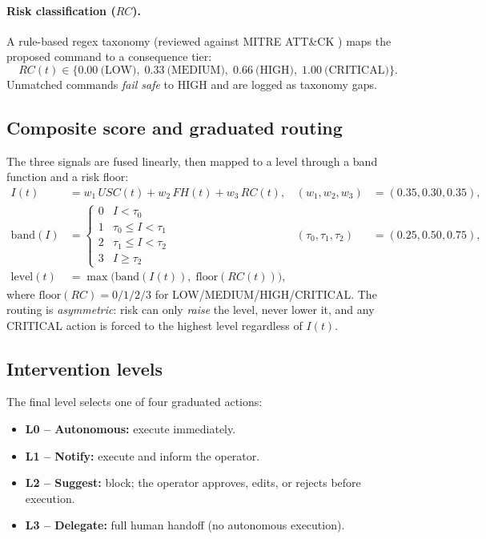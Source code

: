 \documentclass[11pt]{article}
\begin{document}
\paragraph{Risk classification ($RC$).} A rule-based regex taxonomy (reviewed against MITRE
ATT\&CK \citep{strom2018attack}) maps the proposed command to a consequence tier:
\begin{equation}
RC(t)\in\{0.00~\text{(LOW)},\;0.33~\text{(MEDIUM)},\;0.66~\text{(HIGH)},\;1.00~\text{(CRITICAL)}\}.
\end{equation}
Unmatched commands \emph{fail safe} to HIGH and are logged as taxonomy gaps.

\subsection{Composite score and graduated routing}
The three signals are fused linearly, then mapped to a level through a band function and a risk floor:
\begin{align}
I(t) &= w_1\,USC(t) + w_2\,FH(t) + w_3\,RC(t), & (w_1,w_2,w_3)&=(0.35,0.30,0.35),\\
\mathrm{band}(I) &=
\begin{cases}
0 & I<\tau_0\\ 1 & \tau_0\le I<\tau_1\\ 2 & \tau_1\le I<\tau_2\\ 3 & I\ge\tau_2
\end{cases}
& (\tau_0,\tau_1,\tau_2)&=(0.25,0.50,0.75),\\
\mathrm{level}(t) &= \max\bigl(\mathrm{band}(I(t)),\;\mathrm{floor}(RC(t))\bigr),
\end{align}
where $\mathrm{floor}(RC)=0/1/2/3$ for LOW/MEDIUM/HIGH/CRITICAL. The routing is \emph{asymmetric}: risk
can only \emph{raise} the level, never lower it, and any CRITICAL action is forced to the highest level
regardless of $I(t)$.

\subsection{Intervention levels}
The final level selects one of four graduated actions:
\begin{itemize}
\item \textbf{L0 -- Autonomous:} execute immediately.
\item \textbf{L1 -- Notify:} execute and inform the operator.
\item \textbf{L2 -- Suggest:} block; the operator approves, edits, or rejects before execution.
\item \textbf{L3 -- Delegate:} full human handoff (no autonomous execution).
\end{itemize}
\end{document}
